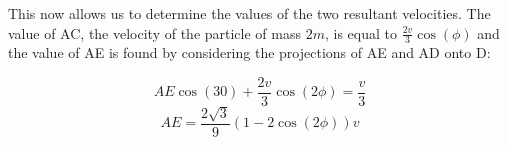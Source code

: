 \begin{problem}
{This now allows us to determine the values of the two resultant velocities. The value of AC, the velocity of the particle of mass $2m$, is equal to $\frac{2v}{3}\cos{(\phi)}$ and the value of AE is found by considering the projections of AE and AD onto D:

\begin{equation*}AE\cos{(30)}+\frac{2v}{3}\cos{(2\phi)}=\frac{v}{3}\end{equation*}
\begin{equation*}AE=\frac{2\sqrt{3}}{9}(1-2\cos{(2\phi)})v\end{equation*}

}
\end{problem}